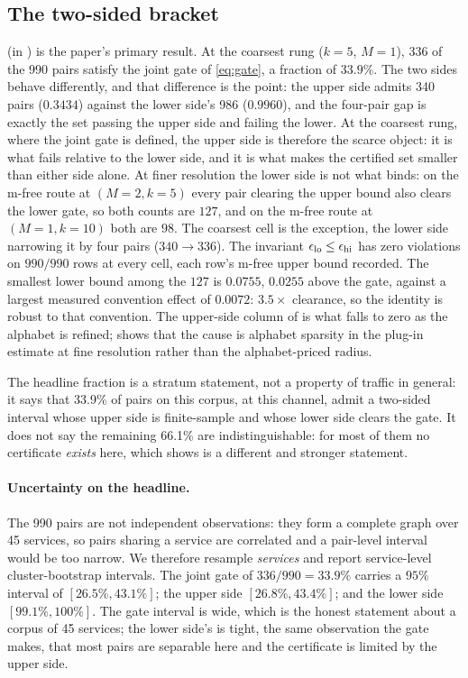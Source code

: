 \subsection{The two-sided bracket}
\label{sec:results/bracket}

 (in ) is the paper's primary result. At the coarsest rung
($k{=}5$, $M{=}1$), 336 of the 990 pairs satisfy the joint gate of
\eqref{eq:gate}, a fraction of $33.9\%$. The two sides behave differently, and
that difference is the point: the upper side admits 340 pairs ($0.3434$) against
the lower side's 986 ($0.9960$), and the four-pair gap is exactly the set
passing the upper side and failing the lower. At the coarsest rung, where the joint gate is defined, the upper
side is therefore the scarce object: it is what fails relative to the lower
side, and it is what makes the certified set smaller than either side alone. At
finer resolution the lower side is not what binds: on the m-free route at
$(M{=}2, k{=}5)$ every pair clearing the upper bound also clears the lower gate,
so both counts are $127$, and on the m-free route at $(M{=}1, k{=}10)$ both are
$98$. The coarsest cell is the exception, the lower side
narrowing it by four pairs ($340\to336$). The invariant $\epsilon_{\mathrm{lo}} \le \epsilon_{\mathrm{hi}}$ has
zero violations on $990/990$ rows at every cell, each row's m-free upper bound
recorded. The smallest lower bound among the $127$ is $0.0755$, $0.0255$ above the
gate, against a largest measured convention effect of $0.0072$: $3.5\times$
clearance, so the identity is robust to that convention. The upper-side column of  is what falls to
zero as the alphabet is refined;  shows that the cause
is alphabet sparsity in the plug-in estimate at fine resolution rather than the
alphabet-priced radius.

The headline fraction is a stratum statement, not a property of traffic in
general: it says that 33.9\% of pairs on this corpus, at this channel, admit a
two-sided interval whose upper side is finite-sample and whose lower side clears
the gate. It does not say the remaining 66.1\% are indistinguishable: for most of
them no certificate \emph{exists} here, which  shows is
a different and stronger statement.

\paragraph{Uncertainty on the headline.}
The 990 pairs are not independent observations: they form a complete graph over
45 services, so pairs sharing a service are correlated and a pair-level interval
would be too narrow. We therefore resample \emph{services} and report
service-level cluster-bootstrap intervals. The joint gate of $336/990 = 33.9\%$
carries a $95\%$ interval of $[26.5\%, 43.1\%]$; the upper side
$[26.8\%, 43.4\%]$; and the lower side $[99.1\%, 100\%]$. The gate interval is
wide, which is the honest statement about a corpus of 45 services; the lower
side's is tight, the same observation the gate makes, that most pairs
are separable here and the certificate is limited by the upper side.


